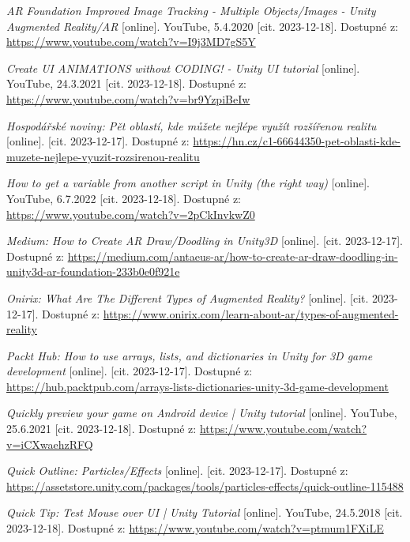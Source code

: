 \documentclass[12pt, a4paper,
twoside,        %
openright
]{report}
\begin{document}
\renewcommand\bibname{Seznam použitých informačních zdrojů}
\begin{thebibliography}{99}
 \textit{AR Foundation Improved Image Tracking - Multiple Objects/Images - Unity Augmented Reality/AR} [online]. YouTube, 5.4.2020 [cit. 2023-12-18]. Dostupné z: \url{https://www.youtube.com/watch?v=I9j3MD7gS5Y}

 \textit{Create UI ANIMATIONS without CODING! - Unity UI tutorial} [online]. YouTube, 24.3.2021 [cit. 2023-12-18]. Dostupné z: \url{https://www.youtube.com/watch?v=br9YzpiBeIw}	

\textit{Hospodářské noviny: Pět oblastí, kde můžete nejlépe využít rozšířenou realitu} [online]. [cit. 2023-12-17]. Dostupné z: \url{https://hn.cz/c1-66644350-pet-oblasti-kde-muzete-nejlepe-vyuzit-rozsirenou-realitu}

 \textit{How to get a variable from another script in Unity (the right way)} [online]. YouTube, 6.7.2022 [cit. 2023-12-18]. Dostupné z: \url{https://www.youtube.com/watch?v=2pCkInvkwZ0}

\textit{Medium: 
How to Create AR Draw/Doodling in Unity3D} [online]. [cit. 2023-12-17]. Dostupné z: \url{https://medium.com/antaeus-ar/how-to-create-ar-draw-doodling-in-unity3d-ar-foundation-233b0e0f921e}

\textit{Onirix: What Are The Different Types of Augmented Reality?} [online]. [cit. 2023-12-17]. Dostupné z: \url{https://www.onirix.com/learn-about-ar/types-of-augmented-reality}

\textit{Packt Hub: How to use arrays, lists, and dictionaries in Unity for 3D game development} [online]. [cit. 2023-12-17]. Dostupné z: \url{https://hub.packtpub.com/arrays-lists-dictionaries-unity-3d-game-development}

 \textit{Quickly preview your game on Android device | Unity tutorial} [online]. YouTube, 25.6.2021 [cit. 2023-12-18]. Dostupné z: \url{https://www.youtube.com/watch?v=iCXwaehzRFQ}

\textit{Quick Outline: Particles/Effects} [online]. [cit. 2023-12-17]. Dostupné z: \url{https://assetstore.unity.com/packages/tools/particles-effects/quick-outline-115488}

 \textit{Quick Tip: Test Mouse over UI | Unity Tutorial} [online]. YouTube, 24.5.2018 [cit. 2023-12-18]. Dostupné z: \url{https://www.youtube.com/watch?v=ptmum1FXiLE}


\end{thebibliography}
\end{document}
